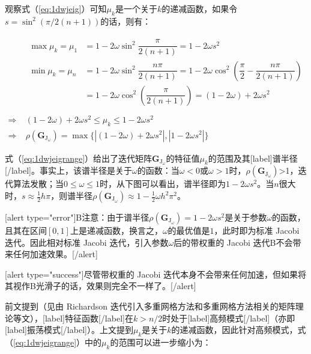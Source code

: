 \documentclass[12pt, UTF8, nofonts]{ctexart}
\begin{document}
观察式（\ref{eq:1dwjeig}）可知$\mu_k$是一个关于$k$的递减函数，如果令$s=\sin^2\left(\pi/2(n+1)\right)$的话，则有：

\begin{equation}
  \label{eq:1dwjeigrange}
  \begin{aligned}
    & \begin{aligned}
      \max{\mu_k} = \mu_{1} &= 1 - 2\omega\sin^2\dfrac{\pi}{2(n+1)} = 1 - 2\omega s^2 \\
      \min{\mu_k} = \mu_{n} &= 1 - 2\omega\sin^2\dfrac{n\pi}{2(n+1)} = 1 - 2\omega\cos^2\left(\dfrac{\pi}{2}-\dfrac{n\pi}{2(n+1)}\right) \\
      &= 1 - 2\omega\cos^2\left(\dfrac{\pi}{2(n+1)}\right) = (1-2\omega) + 2\omega s^2 \\
    \end{aligned} \\
    \Rightarrow \; & (1-2\omega)+2\omega s^2 \leq \mu_k \leq 1 - 2\omega s^2 \\
    \Rightarrow \; & \rho(\boldsymbol{G}_{\mathrm{J}_\omega}) = \max\Big\{|(1-2\omega)+2\omega s^2|,|1-2\omega s^2|\Big\}
  \end{aligned}
\end{equation}

式（\ref{eq:1dwjeigrange}）给出了迭代矩阵$\boldsymbol{G}_{\mathrm{J}_\omega}$的特征值$\mu_k$的范围及其[label]谱半径[/label]。事实上，该谱半径是关于$\omega$的函数：当$\omega<0$或$\omega>1$时，$\rho(\boldsymbol{G}_{\mathrm{J}_\omega})$>1，迭代算法发散；当$0\leq\omega\leq1$时，从下图可以看出，谱半径即为$1-2\omega s^2$。当$n$很大时，$s\approx\frac{1}{2}h\pi$，则谱半径$\rho(\boldsymbol{G}_{\mathrm{J}_\omega}) \approx 1-\frac{1}{2}\omega h^2\pi^2$。

[alert type="error"]B注意：由于谱半径$\rho(\boldsymbol{G}_{\mathrm{J}_\omega})=1-2\omega s^2$是关于参数$\omega$的函数，且其在区间$[0,1]$上是递减函数，换言之，$\omega$的最优值是$1$，此时即为标准 Jacobi 迭代。因此相对标准 Jacobi 迭代，引入参数$\omega$后的带权重的 Jacobi 迭代B不会带来任何加速效果。[/alert]

[alert type="success"]尽管带权重的 Jacobi 迭代本身不会带来任何加速，但如果将其视作B光滑子的话，效果则完全不一样了。[/alert]

前文提到（见由 Richardson 迭代引入多重网格方法和多重网格方法相关的矩阵理论等文），[label]特征函数[/label]在$k>n/2$时处于[label]高频模式[/label]（亦即[label]振荡模式[/label]）。上文提到$\mu_k$是关于$k$的递减函数，因此针对高频模式，式（\ref{eq:1dwjeigrange}）中的$\mu_k$的范围可以进一步缩小为：
\end{document}
